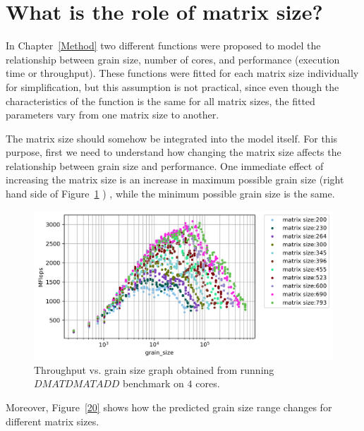 \section{What is the role of matrix size?}
In Chapter~\ref{Method} two different functions were proposed to model the relationship between grain size, number of cores, and performance (execution time or throughput). These functions were fitted for each matrix size individually for simplification, but this assumption is not practical, since even though the characteristics of the function is the same for all matrix sizes, the fitted parameters vary from one matrix size to another. 

The matrix size should somehow be integrated into the model itself. For this purpose, first we need to understand how changing the matrix size affects the relationship between grain size and performance. 
One immediate effect of increasing the matrix size is an increase in maximum possible grain size (right hand side of Figure~\ref{fig19} ) , while the minimum possible grain size is the same.

\vspace{\baselineskip}	
\begin{figure}[H]	
	\centering\includegraphics[scale=.75]{images/fig11.png}			
	\caption{Throughput vs. grain size graph obtained from running $DMATDMATADD$ benchmark  on $4$ cores.}
	\label{fig19}	
\end{figure} 


Moreover, Figure~\ref{20} shows how the predicted grain size range changes for different matrix sizes.
 
